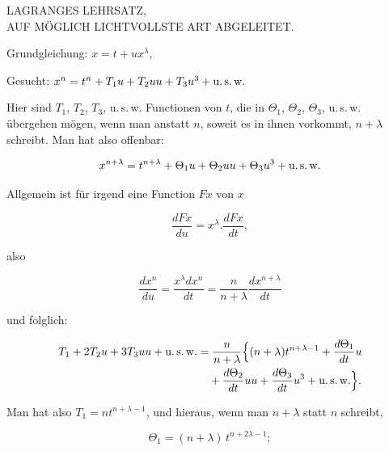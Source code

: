 \clearpage
{}%

\begin{center}
\large LAGRANGES LEHRSATZ,\\ AUF MÖGLICH LICHTVOLLSTE ART ABGELEITET.
\end{center}

\begin{center}\end{center}

\noindent Grundgleichung: \quad $x = t + u x^{\lambda},$

\noindent Gesucht: \quad $x^n = t^n + T_1 u + T_2 uu + T_3 u^3 + \text{u.\,s.\,w.}$

\noindent Hier sind $T_1$, $T_2$, $T_3$, u.\,s.\,w. Functionen von $t$, die in $\Theta_1$, $\Theta_2$, $\Theta_3$, u.\,s.\,w. übergehen mögen, wenn man anstatt $n$, soweit es in ihnen vorkommt, $n+\lambda$ schreibt. Man hat also offenbar:

\[ x^{n+\lambda} = t^{n+\lambda} + \Theta_1 u + \Theta_2 uu + \Theta_3 u^3 + \text{u.\,s.\,w.} \]

Allgemein ist für irgend eine Function $Fx$ von $x$

\[ \frac{dFx}{du} = x^{\lambda} \mathord{.} \frac{dFx}{dt}, \]

\noindent also

\[ \frac{dx^n}{du} = \frac{x^{\lambda} dx^n}{dt} = \frac{n}{n+\lambda} \frac{dx^{n+\lambda}}{dt} \]

\noindent und folglich:

\[\begin{aligned}
T_1 + 2 T_2 u + 3 T_3 uu + \text{u.\,s.\,w.}
&= \frac{n}{n+\lambda}\Bigl\{(n+\lambda)t^{n+\lambda-1}+\frac{d\Theta_1}{dt}u\\
&\quad+\frac{d\Theta_2}{dt}uu+\frac{d\Theta_3}{dt}u^3+\text{u.\,s.\,w.}\Bigr\}.
\end{aligned}\]

\noindent Man hat also $T_1 = n t^{n+\lambda-1}$, und hieraus, wenn man $n+\lambda$ statt $n$ schreibt,

\[ \Theta_1 = (n+\lambda)\, t^{n+2\lambda-1}; \]
